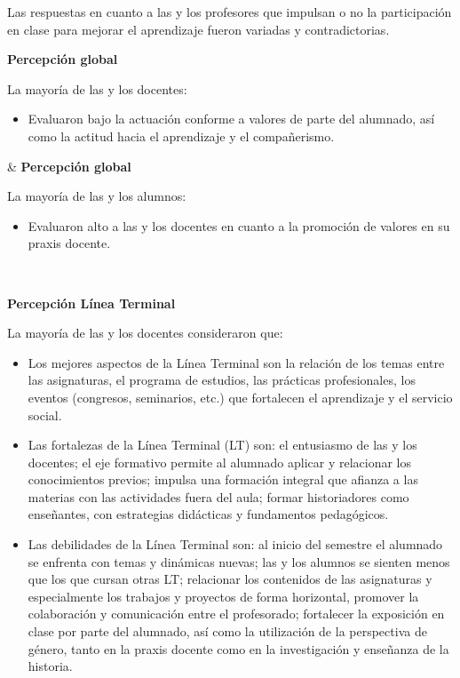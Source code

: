 \begin{center}
\begin{tiny}
\begin{longtabu*}
Las respuestas en cuanto a las y los profesores que impulsan o no la
participación en clase para mejorar el aprendizaje fueron variadas y 
contradictorias.\\
\addlinespace
 
 {\bfseries Percepción global}

La mayoría de las y los docentes:

\begin{itemize}
\item  Evaluaron bajo la actuación conforme a valores de parte del
alumnado, así como la actitud hacia el aprendizaje y el compañerismo. 
\end{itemize}
&
{\bf Percepción global}

La mayoría de las y los alumnos:

\begin{itemize}
\item  Evaluaron alto a las y los docentes en cuanto a la promoción de
valores en su praxis docente. 
\end{itemize} \\
\addlinespace 

 {\bfseries Percepción Línea Terminal}

La mayoría de las y los docentes consideraron que:

\begin{itemize}
\item  Los mejores aspectos de la Línea Terminal son la relación de los temas
entre las asignaturas, el programa de estudios, las prácticas profesionales, los eventos (congresos, seminarios, etc.) que fortalecen el aprendizaje y el servicio social. 

\item Las fortalezas de la Línea Terminal (LT) son: el entusiasmo de las y
los docentes; el eje formativo permite al alumnado aplicar y relacionar los conocimientos previos; impulsa una
formación integral que afianza a las materias con las actividades fuera del aula; formar historiadores como enseñantes,
con estrategias didácticas y fundamentos pedagógicos.

\item Las debilidades de la Línea Terminal son: al inicio del semestre 
el alumnado se enfrenta con temas y dinámicas nuevas; las y los alumnos 
se sienten menos que los que cursan otras LT\@; relacionar los contenidos 
de las asignaturas y especialmente los trabajos y proyectos de forma 
horizontal, promover la colaboración y comunicación entre el 
profesorado; fortalecer la exposición en clase por parte del alumnado, 
así como la utilización de la perspectiva de género, tanto en la praxis 
docente como en la investigación y enseñanza de la historia.


\end{itemize}
\end{longtabu*}
\end{tiny}
\end{center}
